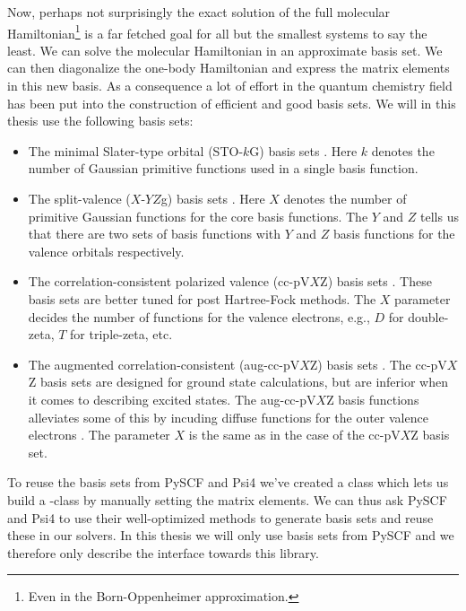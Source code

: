         Now, perhaps not surprisingly the exact solution of the full molecular
        Hamiltonian\footnote{%
            Even in the Born-Oppenheimer approximation.
        } is a far fetched goal for all but the smallest systems to say the
        least.
        We can solve the molecular Hamiltonian in an approximate basis set.
        We can then diagonalize the one-body Hamiltonian and express the
        matrix elements in this new basis.
        As a consequence a lot of effort in the quantum chemistry field has been
        put into the construction of efficient and good basis sets.
        We will in this thesis use the following basis sets:
        \begin{itemize}
            \item The minimal Slater-type orbital (STO-$k$G) basis sets
                \cite{sto-3g}.
                Here $k$ denotes the number of Gaussian primitive functions used
                in a single basis function.
            \item The split-valence ($X$-$YZ$g) basis sets \cite{x-yzg}.
                Here $X$ denotes the number of primitive Gaussian functions for
                the core basis functions.
                The $Y$ and $Z$ tells us that there are two sets of basis
                functions with $Y$ and $Z$ basis functions for the valence
                orbitals respectively.
            \item The correlation-consistent polarized valence (cc-pV$X$Z) basis
                sets \cite{cc-pVXZ}.
                These basis sets are better tuned for post Hartree-Fock methods.
                The $X$ parameter decides the number of functions for the
                valence electrons, e.g., $D$ for double-zeta, $T$ for
                triple-zeta, etc.
            \item The augmented correlation-consistent (aug-cc-pV$X$Z) basis
                sets \cite{aug-cc-pVXZ}.
                The cc-pV$X$Z basis sets are designed for ground state
                calculations, but are inferior when it comes to describing
                excited states.
                The aug-cc-pV$X$Z basis functions alleviates some of this by
                incuding diffuse functions for the outer valence electrons
                \cite{helgaker-molecular}.
                The parameter $X$ is the same as in the case of the cc-pV$X$Z
                basis set.
        \end{itemize}
        To reuse the basis sets from PySCF \cite{pyscf} and Psi4 \cite{psi4}
        we've created a class  which lets us build a
        -class by manually setting the matrix elements.
        We can thus ask PySCF and Psi4 to use their well-optimized methods to
        generate basis sets and reuse these in our solvers.
        In this thesis we will only use basis sets from PySCF and we therefore
        only describe the interface towards this library.

